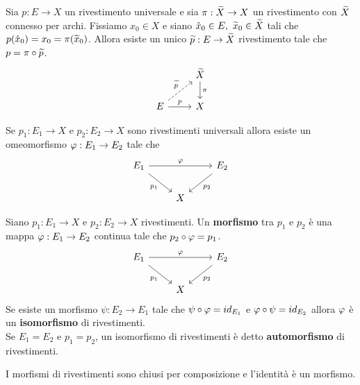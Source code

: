 \begin{multicols*}{2}
\begin{proposition}\label{ProprietaUniversaleRiverstimentoUniversale}
Sia $p:E\to X$ un rivestimento universale e sia $\pi:\widetilde{X}\to X$ un rivestimento con $\widetilde{X}$ connesso per archi. Fissiamo $x_0\in X$ e siano $\hat x_0\in E,\ \widetilde{x}_0\in \widetilde{X}$ tali che $p(\hat x_0)=x_0=\pi(\widetilde{x}_0)$. Allora esiste un unico $\widetilde{p}:E\to \widetilde{X}$ rivestimento tale che $p=\pi\circ \widetilde{p}$.
\[\begin{tikzcd}
	& {\wt X} \\
	E & X
	\arrow["p", from=2-1, to=2-2]
	\arrow["\pi", from=1-2, to=2-2]
	\arrow["{\wt p}", dashed, from=2-1, to=1-2]
\end{tikzcd}\]
\end{proposition}

\begin{corollary}\label{RivestimentiUniversaliInduconoOmeomorfismoTraSpaziTotali}
Se $p_1:E_1\to X$ e $p_2:E_2\to X$ sono rivestimenti universali allora esiste un omeomorfismo $\varphi:E_1\to E_2$ tale che
\[\begin{tikzcd}
	{E_1} && {E_2} \\
	& X
	\arrow["\vp", from=1-1, to=1-3]
	\arrow["{p_1}"', from=1-1, to=2-2]
	\arrow["{p_2}", from=1-3, to=2-2]
\end{tikzcd}\]
\end{corollary}







\begin{definition}
Siano $p_1:E_1\to X$ e $p_2:E_2\to X$ rivestimenti. Un \textbf{morfismo} tra $p_1$ e $p_2$ \`e una mappa $\varphi:E_1\to E_2$ continua tale che $p_2\circ \varphi=p_1$.
\[\begin{tikzcd}
	{E_1} && {E_2} \\
	& X
	\arrow["{p_1}"', from=1-1, to=2-2]
	\arrow["{p_2}", from=1-3, to=2-2]
	\arrow["\vp", from=1-1, to=1-3]
\end{tikzcd}\]
Se esiste un morfismo $\psi:E_2\to E_1$ tale che $\psi\circ \varphi=id_{E_1}$ e $\varphi\circ \psi=id_{E_2}$ allora $\varphi$ \`e un \textbf{isomorfismo} di rivestimenti.\\
Se $E_1=E_2$ e $p_1=p_2$, un isomorfismo di rivestimenti \`e detto \textbf{automorfismo} di rivestimenti.
\end{definition}
\begin{remark}
I morfismi di rivestimenti sono chiusi per composizione e l'identit\`a \`e un morfismo.
\end{remark}



\end{multicols*}
